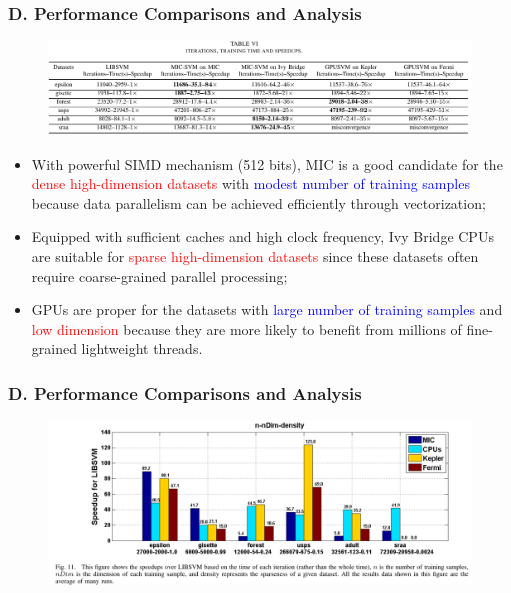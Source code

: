 \documentclass{beamer}
\begin{document}
\begin{frame}
	\frametitle{D. Performance Comparisons and Analysis}	
	\begin{figure}
		\includegraphics[width=1\textwidth]{fig/table6_performance}
	\end{figure} 
	\begin{itemize}
		\item With powerful SIMD mechanism (512 bits), MIC is
		a good candidate for the \textcolor{red}{dense high-dimension datasets} with \textcolor{blue}{modest
		number of training samples} because data parallelism can be achieved
		efficiently through vectorization; 
		\item Equipped with sufficient caches and high clock frequency, Ivy Bridge CPUs are suitable for \textcolor{red}{sparse
		high-dimension datasets} since these datasets often require coarse-grained parallel processing; 
		\item GPUs are proper for the datasets with
		\textcolor{blue}{large number of training samples} and \textcolor{red}{low dimension} because they
		are more likely to benefit from millions of fine-grained lightweight
		threads.
		
		
		
	\end{itemize}		
\end{frame}

\begin{frame}
	\frametitle{D. Performance Comparisons and Analysis}	
	\begin{figure}
		\includegraphics[width=1\textwidth]{fig/fig11_speedup}
	\end{figure} 

\end{frame}
\end{document}
